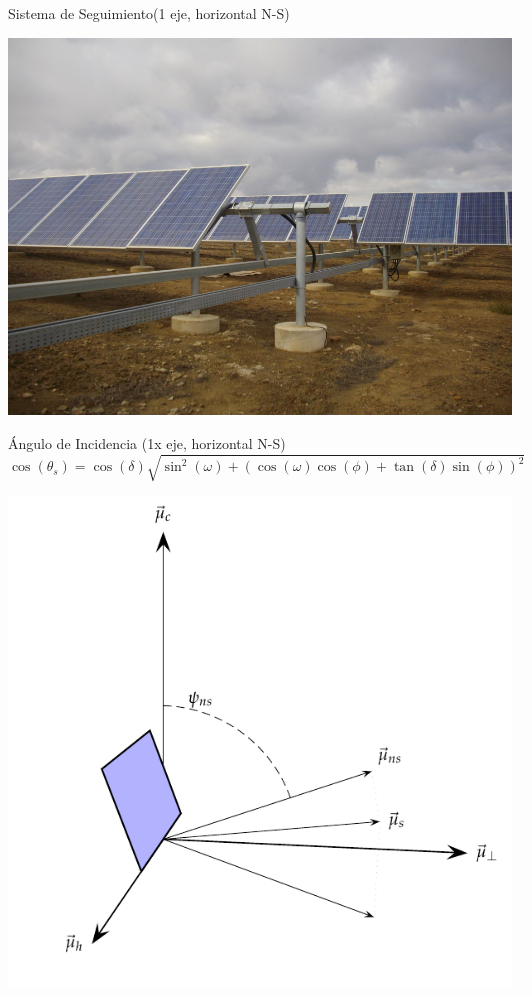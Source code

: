 \documentclass[xcolor={usenames,svgnames,dvipsnames}]{beamer}
\begin{document}
\begin{frame}[label={sec:org9f9eb5e}]{Sistema de Seguimiento(1 eje, horizontal N-S)}
\begin{center}
\includegraphics[width=.9\linewidth]{../figs/SeguidorEjeHorizontal.jpg}
\end{center}
\end{frame}


\begin{frame}[plain,label={sec:org2cd6ec0}]{Ángulo de Incidencia (1x eje, horizontal N-S)}
\[\cos(\theta_{s})=\cos(\delta)\sqrt{\sin^{2}(\omega)+\left(\cos(\omega)\cos(\phi)+\tan(\delta)\sin(\phi)\right)^{2}}\]

\begin{center}
\includegraphics[height=0.6\textheight]{../figs/AngulosSistemaHorizontalNS.pdf}
\end{center}
\end{frame}
\end{document}
